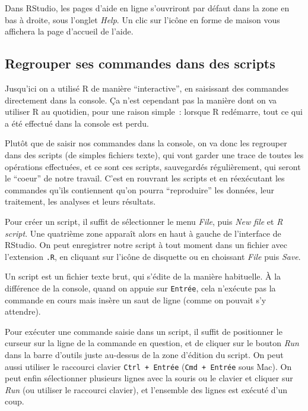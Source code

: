 \documentclass[12pt,]{book}
\begin{document}
Dans RStudio, les pages d'aide en ligne s'ouvriront par défaut dans la zone en bas à droite,
sous l'onglet \emph{Help}. Un clic sur l'icône en forme de maison vous affichera la page d'accueil de l'aide.

\hypertarget{regrouper-ses-commandes-dans-des-scripts}{%
\subsection{Regrouper ses commandes dans des scripts}\label{regrouper-ses-commandes-dans-des-scripts}}

Jusqu'ici on a utilisé R de manière ``interactive'', en saisissant des commandes directement dans la console. Ça n'est cependant pas la manière dont on va utiliser R au quotidien, pour une raison simple~: lorsque R redémarre, tout ce qui a été effectué dans la console est perdu.

Plutôt que de saisir nos commandes dans la console, on va donc les regrouper dans des scripts (de simples fichiers texte), qui vont garder une trace de toutes les opérations effectuées, et ce sont ces scripts, sauvegardés régulièrement, qui seront le ``coeur'' de notre travail. C'est en rouvrant les scripts et en réexécutant les commandes qu'ils contiennent qu'on pourra ``reproduire'' les données, leur traitement, les analyses et leurs résultats.

Pour créer un script, il suffit de sélectionner le menu \emph{File}, puis \emph{New file} et \emph{R script}. Une quatrième zone apparaît alors en haut à gauche de l'interface de RStudio. On peut enregistrer notre script à tout moment dans un fichier avec l'extension \texttt{.R}, en cliquant sur l'icône de disquette ou en choissant \emph{File} puis \emph{Save}.

Un script est un fichier texte brut, qui s'édite de la manière habituelle. À la différence de la console, quand on appuie sur \texttt{Entrée}, cela n'exécute pas la commande en cours mais insère un saut de ligne (comme on pouvait s'y attendre).

Pour exécuter une commande saisie dans un script, il suffit de positionner le curseur sur la ligne de la commande en question, et de cliquer sur le bouton \emph{Run} dans la barre d'outils juste au-dessus de la zone d'édition du script. On peut aussi utiliser le raccourci clavier \texttt{Ctrl\ +\ Entrée} (\texttt{Cmd\ +\ Entrée} sous Mac). On peut enfin sélectionner plusieurs lignes avec la souris ou le clavier et cliquer sur \emph{Run} (ou utiliser le raccourci clavier), et l'ensemble des lignes est exécuté d'un coup.
\end{document}
